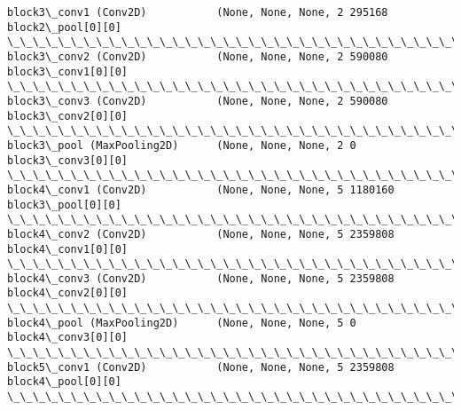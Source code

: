 \documentclass[11pt]{article}
\begin{document}
\begin{Verbatim}[commandchars=\\\{\}]
block3\_conv1 (Conv2D)           (None, None, None, 2 295168      block2\_pool[0][0]                
\_\_\_\_\_\_\_\_\_\_\_\_\_\_\_\_\_\_\_\_\_\_\_\_\_\_\_\_\_\_\_\_\_\_\_\_\_\_\_\_\_\_\_\_\_\_\_\_\_\_\_\_\_\_\_\_\_\_\_\_\_\_\_\_\_\_\_\_\_\_\_\_\_\_\_\_\_\_\_\_\_\_\_\_\_\_\_\_\_\_\_\_\_\_\_\_\_\_
block3\_conv2 (Conv2D)           (None, None, None, 2 590080      block3\_conv1[0][0]               
\_\_\_\_\_\_\_\_\_\_\_\_\_\_\_\_\_\_\_\_\_\_\_\_\_\_\_\_\_\_\_\_\_\_\_\_\_\_\_\_\_\_\_\_\_\_\_\_\_\_\_\_\_\_\_\_\_\_\_\_\_\_\_\_\_\_\_\_\_\_\_\_\_\_\_\_\_\_\_\_\_\_\_\_\_\_\_\_\_\_\_\_\_\_\_\_\_\_
block3\_conv3 (Conv2D)           (None, None, None, 2 590080      block3\_conv2[0][0]               
\_\_\_\_\_\_\_\_\_\_\_\_\_\_\_\_\_\_\_\_\_\_\_\_\_\_\_\_\_\_\_\_\_\_\_\_\_\_\_\_\_\_\_\_\_\_\_\_\_\_\_\_\_\_\_\_\_\_\_\_\_\_\_\_\_\_\_\_\_\_\_\_\_\_\_\_\_\_\_\_\_\_\_\_\_\_\_\_\_\_\_\_\_\_\_\_\_\_
block3\_pool (MaxPooling2D)      (None, None, None, 2 0           block3\_conv3[0][0]               
\_\_\_\_\_\_\_\_\_\_\_\_\_\_\_\_\_\_\_\_\_\_\_\_\_\_\_\_\_\_\_\_\_\_\_\_\_\_\_\_\_\_\_\_\_\_\_\_\_\_\_\_\_\_\_\_\_\_\_\_\_\_\_\_\_\_\_\_\_\_\_\_\_\_\_\_\_\_\_\_\_\_\_\_\_\_\_\_\_\_\_\_\_\_\_\_\_\_
block4\_conv1 (Conv2D)           (None, None, None, 5 1180160     block3\_pool[0][0]                
\_\_\_\_\_\_\_\_\_\_\_\_\_\_\_\_\_\_\_\_\_\_\_\_\_\_\_\_\_\_\_\_\_\_\_\_\_\_\_\_\_\_\_\_\_\_\_\_\_\_\_\_\_\_\_\_\_\_\_\_\_\_\_\_\_\_\_\_\_\_\_\_\_\_\_\_\_\_\_\_\_\_\_\_\_\_\_\_\_\_\_\_\_\_\_\_\_\_
block4\_conv2 (Conv2D)           (None, None, None, 5 2359808     block4\_conv1[0][0]               
\_\_\_\_\_\_\_\_\_\_\_\_\_\_\_\_\_\_\_\_\_\_\_\_\_\_\_\_\_\_\_\_\_\_\_\_\_\_\_\_\_\_\_\_\_\_\_\_\_\_\_\_\_\_\_\_\_\_\_\_\_\_\_\_\_\_\_\_\_\_\_\_\_\_\_\_\_\_\_\_\_\_\_\_\_\_\_\_\_\_\_\_\_\_\_\_\_\_
block4\_conv3 (Conv2D)           (None, None, None, 5 2359808     block4\_conv2[0][0]               
\_\_\_\_\_\_\_\_\_\_\_\_\_\_\_\_\_\_\_\_\_\_\_\_\_\_\_\_\_\_\_\_\_\_\_\_\_\_\_\_\_\_\_\_\_\_\_\_\_\_\_\_\_\_\_\_\_\_\_\_\_\_\_\_\_\_\_\_\_\_\_\_\_\_\_\_\_\_\_\_\_\_\_\_\_\_\_\_\_\_\_\_\_\_\_\_\_\_
block4\_pool (MaxPooling2D)      (None, None, None, 5 0           block4\_conv3[0][0]               
\_\_\_\_\_\_\_\_\_\_\_\_\_\_\_\_\_\_\_\_\_\_\_\_\_\_\_\_\_\_\_\_\_\_\_\_\_\_\_\_\_\_\_\_\_\_\_\_\_\_\_\_\_\_\_\_\_\_\_\_\_\_\_\_\_\_\_\_\_\_\_\_\_\_\_\_\_\_\_\_\_\_\_\_\_\_\_\_\_\_\_\_\_\_\_\_\_\_
block5\_conv1 (Conv2D)           (None, None, None, 5 2359808     block4\_pool[0][0]                
\_\_\_\_\_\_\_\_\_\_\_\_\_\_\_\_\_\_\_\_\_\_\_\_\_\_\_\_\_\_\_\_\_\_\_\_\_\_\_\_\_\_\_\_\_\_\_\_\_\_\_\_\_\_\_\_\_\_\_\_\_\_\_\_\_\_\_\_\_\_\_\_\_\_\_\_\_\_\_\_\_\_\_\_\_\_\_\_\_\_\_\_\_\_\_\_\_\_

\end{Verbatim}
\end{document}
